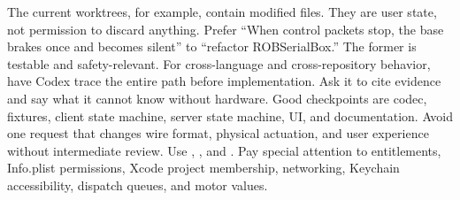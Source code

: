 {}The current worktrees, for example, contain modified\markdownRendererSoftLineBreak
{} files. They are user state, not permission to\markdownRendererSoftLineBreak
{}discard anything.\markdownRendererInterblockSeparator
{}
\markdownRendererSectionEnd \markdownRendererSectionBegin
{}\markdownRendererInterblockSeparator
{}Prefer “When control packets stop, the base brakes once and becomes silent” to\markdownRendererSoftLineBreak
{}“refactor ROBSerialBox.” The former is testable and safety-relevant.\markdownRendererInterblockSeparator
{}
\markdownRendererSectionEnd \markdownRendererSectionBegin
{}\markdownRendererInterblockSeparator
{}For cross-language and cross-repository behavior, have Codex trace the entire\markdownRendererSoftLineBreak
{}path before implementation. Ask it to cite evidence and say what it cannot\markdownRendererSoftLineBreak
{}know without hardware.\markdownRendererInterblockSeparator
{}
\markdownRendererSectionEnd \markdownRendererSectionBegin
{}\markdownRendererInterblockSeparator
{}Good checkpoints are codec, fixtures, client state machine, server state\markdownRendererSoftLineBreak
{}machine, UI, and documentation. Avoid one request that changes wire format,\markdownRendererSoftLineBreak
{}physical actuation, and user experience without intermediate review.\markdownRendererInterblockSeparator
{}
\markdownRendererSectionEnd \markdownRendererSectionBegin
{}\markdownRendererInterblockSeparator
{}\markdownRendererInterblockSeparator
{}
\markdownRendererSectionEnd \markdownRendererSectionBegin
{}\markdownRendererInterblockSeparator
{}Use , , and . Pay special attention\markdownRendererSoftLineBreak
{}to entitlements, Info.plist permissions, Xcode project membership, networking,\markdownRendererSoftLineBreak
{}Keychain accessibility, dispatch queues, and motor values.\markdownRendererInterblockSeparator
{}
\markdownRendererSectionEnd \markdownRendererSectionBegin
{}\markdownRendererInterblockSeparator
